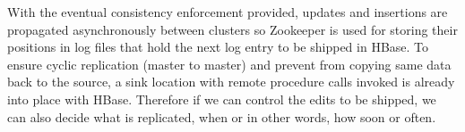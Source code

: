 
With the eventual consistency enforcement provided, updates and insertions are propagated asynchronously between clusters so Zookeeper is used for storing their positions in log files that hold the next log entry to be shipped in HBase. To ensure cyclic replication (master to master) and prevent from copying same data back to the source, a sink location with remote procedure calls invoked is already into place with HBase. Therefore if we can control the edits to be shipped, we can also decide what is replicated, when or in other words, how soon or often.

